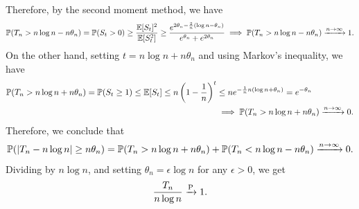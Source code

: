 Therefore, by the second moment method, we have
\begin{align}
    \mathbb{P}(T_{n} > n \log n - n \theta_{n}) = \mathbb{P}(S_{t} > 0) \geq \frac{\mathbb{E}[S_{t}]^{2}}{\mathbb{E}[S_{t}^{2}]} \geq \frac{e^{2\theta_{n}-\frac{2}{n}(\log n -\theta_{n})}}{e^{\theta_{n}}+e^{2\theta_{n}}} \implies \mathbb{P}(T_{n} > n \log n - n \theta_{n}) \xrightarrow{n \to \infty} 1.
\end{align}
On the other hand, setting $t = n \log n + n \theta_{n}$ and using Markov's inequality, we have
\begin{align}
    \mathbb{P}(T_{n} > n \log n + n \theta_{n}) = \mathbb{P}(S_{t} \geq 1) \leq \mathbb{E}[S_{t}] \leq n\left(1-\frac{1}{n}\right)^{t} &\leq ne^{-\frac{1}{n} n(\log n + \theta_{n})} = e^{-\theta_{n}} \notag \\ &\implies \mathbb{P}(T_{n} > n \log n + n \theta_{n}) \xrightarrow{n \to \infty} 0.
\end{align}
Therefore, we conclude that
\begin{align}
    \mathbb{P}(\left| T_{n}-n \log n \right| \geq n \theta_{n}) = \mathbb{P}(T_{n} > n \log n + n \theta_{n}) + \mathbb{P}(T_{n} < n \log n - n \theta_{n}) \xrightarrow{n \to \infty} 0.
\end{align}
Dividing by $n \log n$, and setting $\theta_{n} = \epsilon \log n$ for any $\epsilon > 0$, we get
\begin{align}
    \frac{T_{n}}{n \log n} \xrightarrow{\operatorname{P}} 1.
\end{align}

